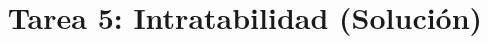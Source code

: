 \documentclass{doc}
\title{Tarea 5: Intratabilidad (Solución)}
\begin{document}
\makedocheader
\soluciontrue

\end{document}
